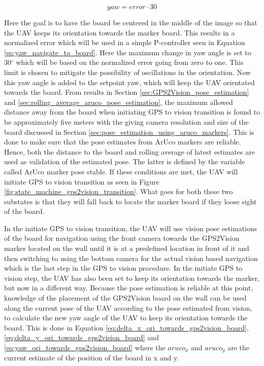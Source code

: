 \documentclass[../Head/report.tex]{subfiles}
\begin{document}
\begin{equation}
	yaw = error \cdot 30
\label{eq:yaw_navigate_to_board}
\end{equation} 

Here the goal is to have the board be centered in the middle of the image so that the UAV keeps its orientation towards the marker board. This results in a normalized error which will be used in a simple P-controller seen in Equation \ref{eq:yaw_navigate_to_board}. Here the maximum change in yaw angle is set to 30$^{\circ}$ which will be based on the normalized error going from zero to one. This limit is chosen to mitigate the possibility of oscillations in the orientation. Now this yaw angle is added to the setpoint yaw, which will keep the UAV orientated towards the board. From results in Section \ref{sec:GPS2Vision_pose_estimation} and \ref{sec:rolling_average_aruco_pose_estimation}, the maximum allowed distance away from the board when initiating GPS to vision transition is found to be approximately five meters with the giving camera resolution and size of the board discussed in Section \ref{sec:pose_estimation_using_aruco_markers}. This is done to make sure that the pose estimates from ArUco markers are reliable. Hence, both the distance to the board and rolling average of latest estimates are used as validation of the estimated pose. The latter is defined by the variable called ArUco marker pose stable. If these conditions are met, the UAV will initiate GPS to vision transition as seen in Figure \ref{fig:state_machine_gps2vision_transition}.  What goes for both these two substates is that they will fall back to locate the marker board if they loose sight of the board. 

In the initiate GPS to vision transition, the UAV will use vision pose estimations of the board for navigation using the front camera towards the GPS2Vision marker located on the wall until it is at a predefined location in front of it and then switching to using the bottom camera for the actual vision based navigation which is the last step in the GPS to vision procedure. In the initiate GPS to vision step, the UAV has also been set to keep its orientation towards the marker, but now in a different way. Because the pose estimation is reliable at this point, knowledge of the placement of the GPS2Vision board on the wall can be used along the current pose of the UAV according to the pose estimated from vision, to calculate the new yaw angle of the UAV to keep its orientation towards the board. This is done in Equation \ref{eq:delta_x_ori_towards_gps2vision_board}, \ref{eq:delta_y_ori_towards_gps2vision_board} and \ref{eq:yaw_ori_towards_gps2vision_board} where the $aruco_x$ and $aruco_y$ are the current estimate of the position of the board in x and y. 
\end{document}
